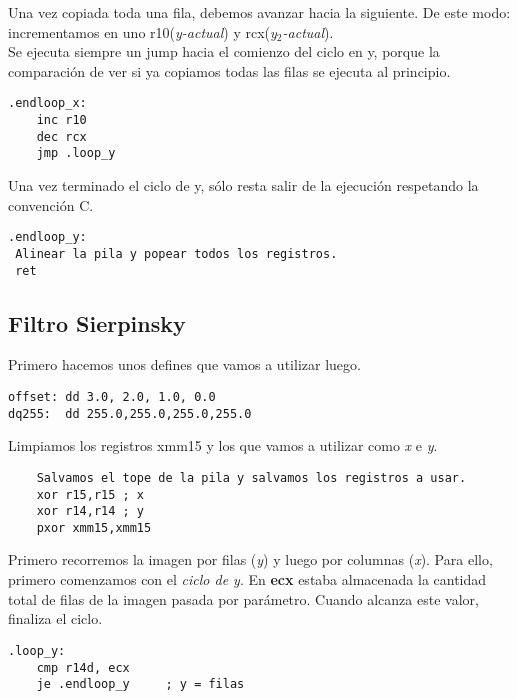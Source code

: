 \documentclass[a4paper]{article}
\begin{document}
\indent Una vez copiada toda una fila, debemos avanzar hacia la siguiente. De este modo: incrementamos en uno r10(\emph{y-actual}) y rcx(\emph{y$_2$-actual}). \\
\indent Se ejecuta siempre un jump hacia el comienzo del ciclo en y, porque la comparaci\'on de ver si ya copiamos todas las filas se ejecuta al principio.
	  \begin{codesnippet}
\begin{verbatim}
.endloop_x:
	inc r10
	dec rcx
	jmp .loop_y
\end{verbatim}
\end{codesnippet}

\indent Una vez terminado el ciclo de y, s\'olo resta salir de la ejecuci\'on respetando la convenci\'on C.
	  \begin{codesnippet}
\begin{verbatim}
.endloop_y:
 Alinear la pila y popear todos los registros.
 ret
\end{verbatim}
\end{codesnippet}

\newpage
\subsection{Filtro Sierpinsky}

\indent Primero hacemos unos defines que vamos a utilizar luego.
 \begin{codesnippet}
\begin{verbatim}
offset: dd 3.0, 2.0, 1.0, 0.0
dq255:  dd 255.0,255.0,255.0,255.0
\end{verbatim}
\end{codesnippet}

\indent Limpiamos los registros xmm15 y los que vamos a utilizar como \emph{x} e \emph{y}.
 \begin{codesnippet}
\begin{verbatim}
    Salvamos el tope de la pila y salvamos los registros a usar.
    xor r15,r15 ; x
    xor r14,r14 ; y
    pxor xmm15,xmm15
\end{verbatim}
\end{codesnippet}

\indent Primero recorremos la imagen por filas (\emph{y}) y luego por columnas (\emph{x}). Para ello, primero comenzamos con el \textit{ciclo de y}. En \textbf{ecx} estaba almacenada la cantidad total de filas de la imagen pasada por par\'ametro. Cuando alcanza este valor, finaliza el ciclo.
 \begin{codesnippet}
\begin{verbatim}
.loop_y:
    cmp r14d, ecx
    je .endloop_y     ; y = filas
\end{verbatim}
\end{codesnippet}
\end{document}
